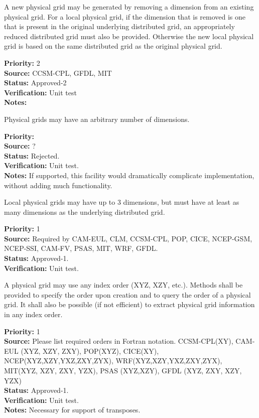 A new physical grid may be generated by removing a dimension from an existing physical grid.
For a local physical grid, if the dimension that is removed is one that is present 
in the original underlying distributed grid, an appropriately reduced distributed 
grid must also be provided.  Otherwise the new local physical
grid is based on the same distributed grid as the original physical grid.
\begin{reqlist}
{\bf Priority:} 2 \\
{\bf Source:} CCSM-CPL, GFDL, MIT \\
{\bf Status:} Approved-2 \\
{\bf Verification:} Unit test\\
{\bf Notes:} 
\end{reqlist}

Physical grids may have an arbitrary number of dimensions. 
\begin{reqlist}
{\bf Priority:} \\
{\bf Source:} ? \\
{\bf Status:} Rejected.\\
{\bf Verification:} Unit test.\\
{\bf Notes:} If supported, this facility would dramatically complicate implementation,
without adding much functionality.
\end{reqlist}

Local physical grids may have up to 3 dimensions, but must have at least as many dimensions as the
underlying distributed grid. 
\begin{reqlist}
{\bf Priority:}  1\\
{\bf Source:} Required by CAM-EUL, CLM, CCSM-CPL, POP, CICE, NCEP-GSM, NCEP-SSI,
              CAM-FV, PSAS, MIT, WRF, GFDL. \\
{\bf Status:} Approved-1. \\
{\bf Verification:} Unit test.\\
\end{reqlist}

A physical grid may use any index order (XYZ, XZY, etc.).  Methods shall be provided to
specify the order upon creation and to query the order of a physical grid.  It shall
also be possible (if not efficient) to extract physical grid information in any index
order.
\begin{reqlist}
{\bf Priority:}  1 \\
{\bf Source:} Please list required orders in Fortran notation. CCSM-CPL(XY), 
CAM-EUL (XYZ, XZY, ZXY), POP(XYZ), CICE(XY), NCEP(XYZ,XZY,YXZ,ZXY,ZYX), 
WRF(XYZ,XZY,YXZ,ZXY,ZYX),
MIT(XYZ, XZY, ZXY, YZX),
PSAS (XYZ,XZY), GFDL (XYZ, ZXY, XZY, YZX) \\
{\bf Status:} Approved-1. \\
{\bf Verification:} Unit test.\\
{\bf Notes:} Necessary for support of transposes.
\end{reqlist}

